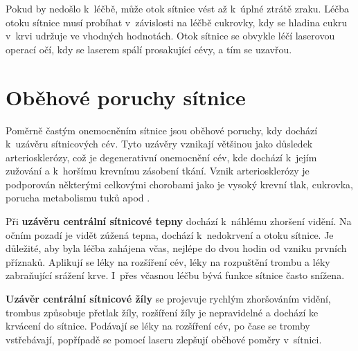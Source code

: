 Pokud by nedošlo k~léčbě, může otok sítnice vést až k~úplné ztrátě zraku. Léčba otoku sítnice musí probíhat v~závislosti na léčbě cukrovky,  kdy se hladina cukru v~krvi udržuje ve vhodných hodnotách. Otok sítnice se obvykle léčí laserovou operací očí, kdy se laserem spálí prosakující cévy, a tím se uzavřou.


\section{Oběhové poruchy sítnice}
Poměrně častým onemocněním sítnice jsou oběhové poruchy, kdy dochází k~uzávěru sítnicových cév. Tyto uzávěry vznikají většinou jako důsledek arteriosklerózy, což je degenerativní onemocnění cév, kde dochází k~jejím zužování a k~horšímu krevnímu zásobení tkání. Vznik arteriosklerózy je podporován některými celkovými chorobami jako je vysoký krevní tlak, cukrovka, porucha metabolismu tuků apod \cite{nemoci}.

Při \textbf{uzávěru centrální sítnicové tepny} dochází k~náhlému zhoršení vidění. Na očním pozadí je vidět zúžená tepna, dochází k~nedokrvení a otoku sítnice. Je důležité, aby byla léčba zahájena včas, nejlépe do dvou hodin od vzniku prvních příznaků. Aplikují se léky na rozšíření cév, léky na rozpuštění trombu a léky zabraňující srážení krve. I~přes včasnou léčbu bývá funkce sítnice často snížena.

\textbf{Uzávěr centrální sítnicové žíly} se projevuje rychlým zhoršováním vidění, trombus způsobuje přetlak žíly, rozšíření žíly je nepravidelné a dochází ke krvácení do sítnice. Podávají se léky na rozšíření cév, po čase se tromby vstřebávají, popřípadě se pomocí laseru zlepšují oběhové poměry v~sítnici.
